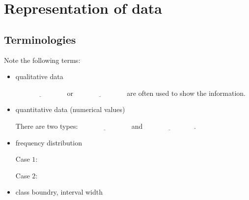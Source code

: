 \section{Representation of data}
\subsection{Terminologies}

Note the following terms:

\begin{itemize}

	\item qualitative data
	
	
	$\underline{\hspace{3cm}}$ or $\underline{\hspace{3cm}}$  are often used to show the information.
	\item quantitative data (numerical values)
	
	There are two types:  $\underline{\hspace{3cm}}$ and $\underline{\hspace{3cm}}$.
	
	
	\item frequency distribution
	
	Case $1$:
	\vspace{1cm}
	
	Case $2$:
	
	
	\item class boundry, interval width
	
\end{itemize}






\exercise  %

